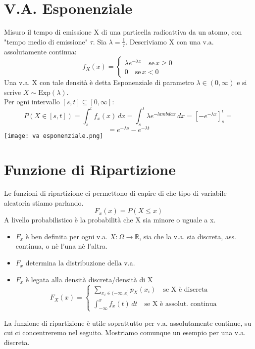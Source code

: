 \section{V.A. Esponenziale}
Misuro il tempo di emissione X di una particella radioattiva da un atomo, con 
"tempo medio di emissione" $\tau$. Sia $\lambda = \frac{1}{\tau}$.
Descriviamo X con una v.a. assolutamente continua:
\begin{equation*}
    f_X(x) =
    \begin{cases}
        \lambda e^{-\lambda x} \quad \text{se} \, x \geq 0 \\
        0 \quad \text{se} \, x < 0 
    \end{cases}
\end{equation*}
Una v.a. X con tale densità è detta Esponenziale di parametro $\lambda \in (0, \infty)$
e si scrive $X \sim \text{Exp}(\lambda)$.
\\ Per ogni intervallo $[s, t] \subseteq [0, \infty]$:
\begin{equation*}
    P(X \in [s, t]) = \int_{s}^{t} f_x(x)\,dx = \int_{s}^{t} \lambda e^{-lambda x}\,dx=
    [- e^{-\lambda x}]_{s}^{t} =
\end{equation*}
\begin{equation*}
    = e^{-\lambda s} - e^{-\lambda t}
\end{equation*}
\texttt{[image: va esponenziale.png]}
\section{Funzione di Ripartizione}
Le funzioni di ripartizione ci permettono di capire di che tipo di variabile aleatoria
stiamo parlando.
\begin{equation*}
    F_x (x) = P(X \leq x)
\end{equation*}
A livello probabilistico è la probabilità che X sia minore o uguale a x.
\begin{itemize}
    \item $F_x$ è ben definita per ogni v.a. $X: \Omega \rightarrow \mathbb{R}$, sia che la v.a.
    sia discreta, ass. continua, o nè l'una nè l'altra.
    \item $F_x$ determina la distribuzione della v.a.
    \item $F_x$ è legata alla densità discreta/densità di X
    \begin{equation*}
        F_X(x) = 
        \begin{cases}
        \sum_{x_i \in (- \infty, x]} p_X (x_i) \quad \text{se X è discreta}\\
        \int_{-\infty}^{x} f_x(t)\,dt \quad \text{se X è assolut. continua} 
        \end{cases}
    \end{equation*}
\end{itemize}
La funzione di ripartizione è utile soprattutto per v.a. assolutamente continue, su cui
ci concentreremo nel seguito. Mostriamo comunque un esempio per una v.a. discreta.
